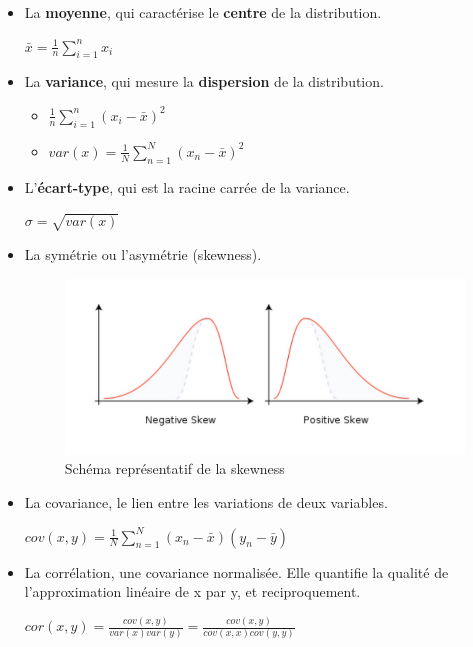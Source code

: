 \documentclass{article}
\begin{document}
\begin{itemize}
\item La \textbf{moyenne}, qui caractérise le \textbf{centre} de la distribution.

$ \bar{x} = \frac{1}{n} \sum_{i=1}^{n} x_i $

\item La \textbf{variance}, qui mesure la \textbf{dispersion} de la distribution.

\begin{itemize}

\item $ \frac{1}{n} \sum_{i=1}^{n} (x_i - \bar{x})^{2} $

\item $ var(x) = \frac{1}{N} \sum_{n=1}^{N} (x_n - \bar{x})^2 $

\end{itemize}

\item L'\textbf{écart-type}, qui est la racine carrée de la variance.

$\sigma = \sqrt{var(x)}$

\item La symétrie ou l'asymétrie (skewness).

\begin{figure}[H]
   \caption{Schéma représentatif de la skewness}
    \begin{center} \includegraphics[scale=0.4]{skewness.png} \end{center}
\end{figure}


\item La covariance, le lien entre les variations de deux variables.

$ cov(x, y) = \frac{1}{N} \sum_{n=1}^{N} (x_n - \bar{x}) (y_n - \bar{y}) $

\item La corrélation, une covariance normalisée. Elle quantifie la qualité de l'approximation linéaire de x par y, et reciproquement.

$ cor(x, y) = \frac{cov(x, y)}{var(x) var(y)} = \frac{cov(x, y)}{cov(x, x) cov(y, y)} $


\end{itemize}
\end{document}
